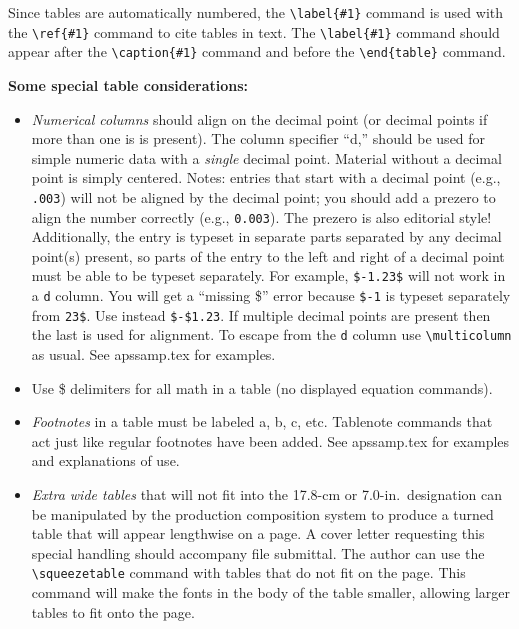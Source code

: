 Since tables are automatically numbered, the \verb+\label{#1}+ command is
used with the \verb+\ref{#1}+ command to cite tables in text.  The
\verb+\label{#1}+ command should appear after the \verb+\caption{#1}+
command and before the \verb+\end{table}+ command.
\bigskip

{\bf Some special table considerations:}
\begin{itemize}

\item {\em Numerical columns\/} should align on the decimal point (or
decimal points if more than one is is present). The column specifier
``d,'' should be used for simple numeric data with a
{\em single\/} decimal point. Material without a decimal point is simply
centered. Notes: entries that start with a decimal point (e.g.,
\verb+.003+) will not be aligned by the decimal point; you should add a
prezero to align the number correctly (e.g., \verb+0.003+). The
prezero is also editorial style! Additionally,
the entry is typeset in separate parts separated by any decimal point(s)
present, so parts of the entry to the left and right of a decimal point
must be able to be typeset separately. For example, \verb+$-1.23$+ will not
work in a \verb+d+ column. You will get a ``missing \$'' error because
\verb+$-1+ is typeset separately from \verb+23$+. Use instead
\verb+$-$1.23+. If multiple decimal points are present then the last is
used for alignment. To escape from the \verb+d+ column use
\verb+\multicolumn+ as usual. See apssamp.tex for examples.

\item Use \$ delimiters for all math in a table (no displayed equation
commands).

\item {\em  Footnotes\/} in a table must be labeled a, b, c, etc. Tablenote
commands that act just like regular footnotes have been added.  See
apssamp.tex for examples and explanations of use.

\item {\em Extra wide tables\/}
that will not fit into the 17.8-cm or 7.0-in.\ designation can be
manipulated by the production composition system to produce a turned table that will
appear lengthwise on a page.  A cover letter requesting this special
handling should accompany file submittal. The author can use the
\verb+\squeezetable+ command with tables that do not fit on the page. This
command will make the fonts in the body of the table smaller, allowing
larger tables to fit onto the page.

\end{itemize}

